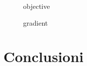 \documentclass[a4paper]{article}
\begin{document}
\begin{figure}
    \begin{center}
        \scalebox{0.65}{}
    \end{center}
    \caption{objective}
\end{figure}

\begin{figure}
    \begin{center}
        \scalebox{0.65}{}
    \end{center}
    \caption{gradient}
\end{figure}

\section{Conclusioni}
\end{document}
